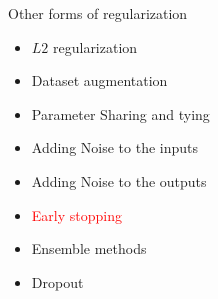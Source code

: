 \begin{frame}
\end{frame}

\begin{frame}
	\vspace{4em}
	\begin{overlayarea}{\textwidth}{\textheight}
		\begin{block}{Other forms of regularization}
			\begin{itemize}
				\item $L2$ regularization
				\item Dataset augmentation
				\item Parameter Sharing and tying
				\item Adding Noise to the inputs
				\item Adding Noise to the outputs 
				\item \textcolor<2->{red}{Early stopping}
				\item Ensemble methods
				\item Dropout
			\end{itemize}
		\end{block}
	\end{overlayarea}
\end{frame}


